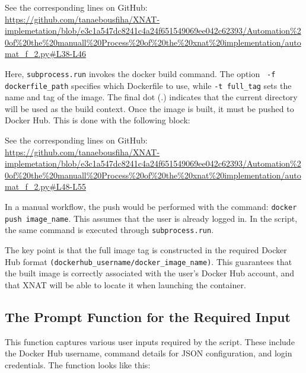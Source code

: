 

\noindent\footnotesize See the corresponding lines on GitHub:\url{ https://github.com/tanaebousfiha/XNAT-implemetation/blob/e3c1a547dc8241c4a24f651549069ee042c62393/Automation%20of%20the%20manuall%20Process%20of%20the%20xnat%20implementation/automat_f_2.py#L38-L46}
\normalsize






Here, \texttt{subprocess.run} invokes the docker build command. The option \texttt{ -f dockerfile\_path} specifies which Dockerfile to use, while \texttt{-t full\_tag} sets the name and tag of the image. The final dot (.) indicates that the current directory will be used as the build context.
Once the image is built, it must be pushed to Docker Hub. This is done with the following block:


\noindent\footnotesize See the corresponding lines on GitHub:\url{ https://github.com/tanaebousfiha/XNAT-implemetation/blob/e3c1a547dc8241c4a24f651549069ee042c62393/Automation%20of%20the%20manuall%20Process%20of%20the%20xnat%20implementation/automat_f_2.py#L48-L55}
\normalsize




In a manual workflow, the push would be performed with the command:  \texttt{docker push image\_name}. This assumes that the user is already logged in. In the script, the same command is executed through  \texttt{subprocess.run}.

The key point is that the full image tag is constructed in the required Docker Hub format \texttt{(dockerhub\_username/docker\_image\_name)}. This guarantees that the built image is correctly associated with the user’s Docker Hub account, and that XNAT will be able to locate it when launching the container.

\subsection{The Prompt Function for the Required Input}

This function captures various user inputs required by the script. These include the Docker Hub username, command details for JSON configuration, and login credentials.
The function looks like this:
 
